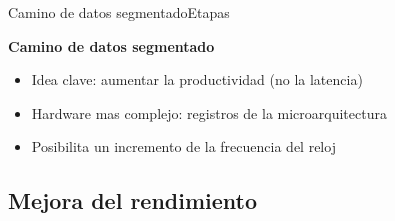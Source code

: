\documentclass[aspectratio=169,compress]{beamer}
\begin{document}
\begin{footnotesize}
\begin{frame}
\end{frame}



\begin{frame}{Camino de datos segmentado}{Etapas}
\begin{center}\textbf{Camino de datos segmentado}\end{center}
\begin{itemize}
\item Idea clave: aumentar la productividad (no la latencia)
\item Hardware mas complejo: registros de la microarquitectura
\item Posibilita un incremento de la frecuencia del reloj
\end{itemize}

\end{frame}



\subsection{Mejora del rendimiento}


\end{footnotesize}
\end{document}
